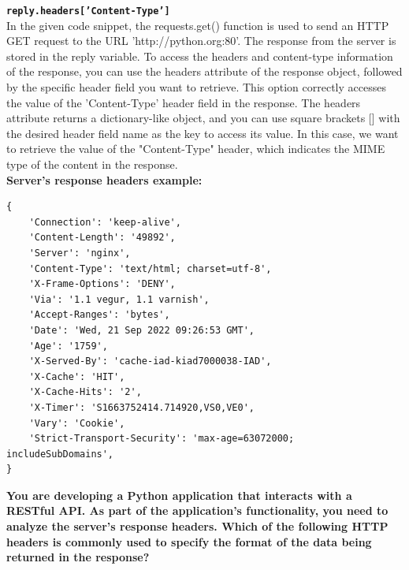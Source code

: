 \textbf{\texttt{reply.headers['Content-Type']}}\\
In the given code snippet, the requests.get() function is used to send an HTTP GET request to the URL 'http://python.org:80'. The response from the server is stored in the reply variable. To access the headers and content-type information of the response, you can use the headers attribute of the response object, followed by the specific header field you want to retrieve. This option correctly accesses the value of the 'Content-Type' header field in the response. The headers attribute returns a dictionary-like object, and you can use square brackets [] with the desired header field name as the key to access its value. In this case, we want to retrieve the value of the "Content-Type" header, which indicates the MIME type of the content in the response.\\

\textbf{Server’s response headers example:}

\begin{verbatim}
{
    'Connection': 'keep-alive',
    'Content-Length': '49892',
    'Server': 'nginx',
    'Content-Type': 'text/html; charset=utf-8',
    'X-Frame-Options': 'DENY',
    'Via': '1.1 vegur, 1.1 varnish',
    'Accept-Ranges': 'bytes',
    'Date': 'Wed, 21 Sep 2022 09:26:53 GMT',
    'Age': '1759',
    'X-Served-By': 'cache-iad-kiad7000038-IAD',
    'X-Cache': 'HIT',
    'X-Cache-Hits': '2',
    'X-Timer': 'S1663752414.714920,VS0,VE0',
    'Vary': 'Cookie',
    'Strict-Transport-Security': 'max-age=63072000; includeSubDomains',
}
\end{verbatim}

\newpage
\textbf{You are developing a Python application that interacts with a RESTful API. As part of the application's functionality, you need to analyze the server's response headers. Which of the following HTTP headers is commonly used to specify the format of the data being returned in the response?}

